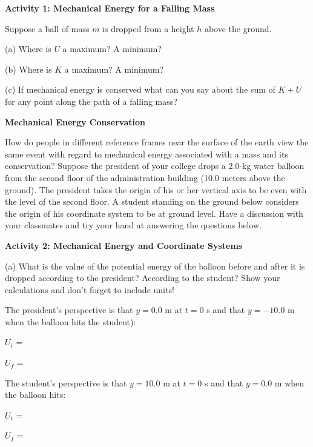 \textbf{Activity 1: Mechanical Energy for a Falling Mass} 

Suppose a ball of mass $m$ is dropped from a height $h$ above the ground.

(a) Where is $U$ a maximum? A minimum?
\vspace{20mm}

(b) Where is $K$ a maximum? A minimum?
\vspace{20mm}

(c) If mechanical energy is conserved what can you say about the sum of $K+ U$ 
for any point along the path of a falling mass?
\vspace{20mm}


\textbf{Mechanical Energy Conservation }

How do people in different reference frames near the surface of the earth view
the same event with regard to mechanical energy associated with a mass and its
conservation? Suppose the president of your college drops a 2.0-kg 
water balloon
from the second floor of the administration building (10.0 meters above the
ground). The president takes the origin of his or her vertical axis to be even
with the level of the second floor. A student standing on the ground below considers
the origin of his coordinate system to be at ground level. Have a discussion
with your classmates and try your hand at answering the questions below.

\textbf{Activity 2: Mechanical Energy and Coordinate Systems} 

(a) What is the value of the potential energy of the balloon before and after
it is dropped according to the president? According to the student? Show your
calculations and don't forget to include units!

The president's perspective is that $y = 0.0$ m at $t = 0$ s and that 
$y = -10.0$ m
when the balloon hits the student): 
\vspace{5mm}

\( U_{i} \) = 
\vspace{5mm}

\( U_{f} \) =
\vspace{5mm}

The student's perspective is that $y = 10.0$ m at $t = 0$ s and that 
$y = 0.0$ m when
the balloon hits: 
\vspace{5mm}

\( U_{i} \) = 
\vspace{5mm}

\( U_{f} \) =
\vspace{5mm}


